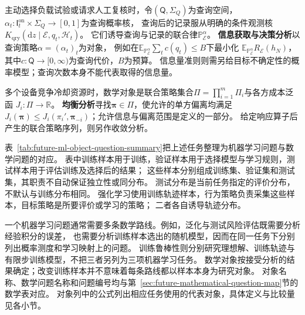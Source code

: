 主动选择负载试验或请求人工复核时，令$(\mathsf Q,\Sigma_Q)$为查询空间，
$\alpha_t:\mathsf I_t^{\mathrm{on}}\times\Sigma_Q\to[0,1]$为查询概率核，
查询后的记录服从明确的条件观测核
$K_{\mathrm{qry}}(\mathrm dz\mid\mathcal E,q_t,\mathscr H_t)$。
它们诱导查询与记录的联合律$\mathbb P_{\mathcal E}^{\alpha}$。
\textbf{信息获取与决策分析}以查询策略$\alpha=(\alpha_t)_t$为对象，
例如在$\mathbb E_{\mathbb P_{\mathcal E}^{\alpha}}\sum_t c(q_t)\leq B$下最小化
$\mathbb E_{\mathbb P_{\mathcal E}^{\alpha}}R_{\mathcal E}(h_N)$，
其中$c:\mathsf Q\to[0,\infty)$为查询代价，$B$为预算。
信息量准则则需另给目标不确定性的概率模型；查询次数本身不能代表取得的信息量。

多个设备竞争冷却资源时，数学对象是联合策略集合$\Pi=\prod_{i=1}^m\Pi_i$与各方成本泛函
$J_i:\Pi\to\mathbb R$。
\textbf{均衡分析}寻找$\bm\pi\in\Pi$，使允许的单方偏离均满足
$J_i(\bm\pi)\leq J_i(\pi_i',\bm\pi_{-i})$；允许信息与偏离范围是定义的一部分。
给定响应算子后产生的联合策略序列，则另作收敛分析。

表~\ref{tab:future-ml-object-question-summary}把上述任务整理为机器学习问题与数学问题的对应。
表中训练样本用于训练，验证样本用于选择模型与学习规则，测试样本用于评估训练及选择后的结果；
这些样本分别组成训练集、验证集和测试集，其职责不自动保证独立性或同分布。
测试分布是当前任务指定的评价分布，不默认与训练分布相同。
强化学习使用训练轨迹样本，行为策略负责采集这些样本，目标策略是所要评价或学习的策略；
二者各自诱导轨迹分布。

一个机器学习问题通常需要多条数学路线。例如，泛化与测试风险评估既需要分析经验积分的误差，
也需要分析训练样本选出的随机模型，因而在同一任务下分别列出概率测度和学习映射上的问题。
训练鲁棒性则分别研究理想解、训练轨迹与有限步训练模型，不把三者另列为三项机器学习任务。
数学对象按接受分析的结果确定；改变训练样本并不意味着每条路线都以样本本身为研究对象。
对象名称、数学问题名称和问题编号均与第~\ref{sec:future-mathematical-question-map}节的数学表对应。
对象列中的公式列出相应任务使用的代表对象，具体定义与比较量见各小节。

